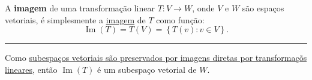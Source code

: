 \begin{definition}
	A \textbf{imagem} de uma transformação linear $T\colon V\to W$, onde $V$ e $W$ são espaços vetoriais, é simplesmente a \href{http://mtm.ufsc.br/~cordeiro/ensino/mtm3112.algebra.linear/10.nucleo.imagem/rev_im_preim_moodle.html}{imagem} de $T$ como função:
	\[\operatorname{Im}(T)=T(V)=\left\{T(v):v\in V\right\}.\]
	
	\hrule
	
	Como \href{http://mtm.ufsc.br/~cordeiro/ensino/mtm3112.algebra.linear/10.nucleo.imagem/teo_im_direta_de_subesp_e_subesp_moodle.html}{subespaços vetoriais são preservados por imagens diretas por transformaçõs lineares}, então $\operatorname{Im}(T)$ é um subespaço vetorial de $W$.
\end{definition}